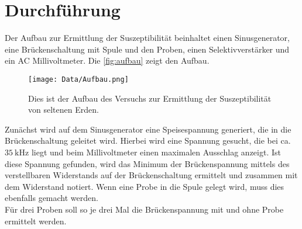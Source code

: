 \newpage
\section{Durchführung}
\label{sec:Durchführung}

Der Aufbau zur Ermittlung der Suszeptibilität beinhaltet einen Sinusgenerator, eine Brückenschaltung mit Spule und den Proben, einen Selektivverstärker und ein AC Millivoltmeter.
Die \autoref{fig:aufbau} zeigt den Aufbau.

\begin{figure}[htbp]
    \centering
    \texttt{[image: Data/Aufbau.png]}
    \caption{Dies ist der Aufbau des Versuchs zur Ermittlung der Suszeptibilität von seltenen Erden.}
    \label{fig:aufbau}
\end{figure}

Zunächst wird auf dem Sinusgenerator eine Speisespannung generiert, die in die Brückenschaltung geleitet wird.
Hierbei wird eine Spannung gesucht, die bei ca. $\SI{35}{\kilo\hertz}$ liegt und beim Millivoltmeter einen maximalen Ausschlag anzeigt.
Ist diese Spannung gefunden, wird das Minimum der Brückenspannung mittels des verstellbaren Widerstands auf der Brückenschaltung ermittelt und zusammen mit dem Widerstand notiert.
Wenn eine Probe in die Spule gelegt wird, muss dies ebenfalls gemacht werden.\\
Für drei Proben soll so je drei Mal die Brückenspannung mit und ohne Probe ermittelt werden.